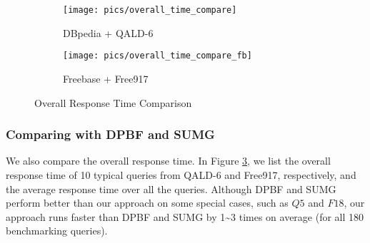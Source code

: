 \begin{figure} [t]
	\newcommand{\mywidth}{0.48\textwidth}
	\centering
	\begin{subfigure}[t]{\mywidth}
		\centering
		\scalebox{0.50}
		{
			\texttt{[image: pics/overall\_time\_compare]}
			
		}
		\vspace{-0.1in}
		\caption{DBpedia + QALD-6}
		\label{fig:timecompare_db}
		\vspace{-0.1in}
	\end{subfigure}
	\begin{subfigure}[t]{\mywidth}
		\centering
		\scalebox{0.50}
		{
			\texttt{[image: pics/overall\_time\_compare\_fb]}
		}
		\vspace{-0.1in}
		\caption{Freebase + Free917}
		\label{fig:timecompare_fb}
	\end{subfigure}
	\vspace{-0.15in}
	\caption{Overall Response Time Comparison}    
	\label{fig:timecompare}
	\vspace{-0.2in}
\end{figure}

\vspace{-0.05in}
\subsubsection{Comparing with DPBF and SUMG}
We also compare the overall response time.
In Figure \ref{fig:timecompare}, we list the overall response time of 
10 typical queries from QALD-6 and Free917, respectively, and the average response time over all the queries.
Although DPBF and SUMG perform better than our approach on some special cases, such as $Q5$ and $F18$, our approach runs faster than DPBF and SUMG by 1\textasciitilde3 times on average (for all 180 benchmarking queries).


%




